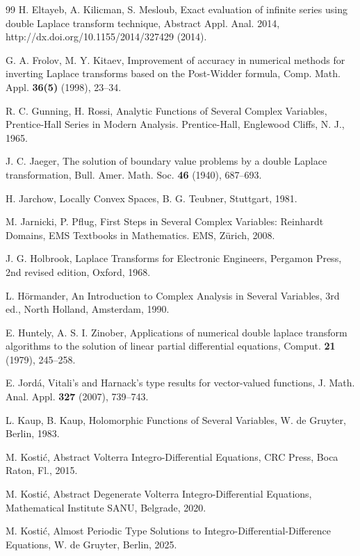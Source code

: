 \documentclass{amsart}
\theoremstyle{definition}
\theoremstyle{remark}
\numberwithin{equation}{section}
\begin{document}
\begin{thebibliography}{99}
H. Eltayeb, A. Kilicman, S. Mesloub,
Exact evaluation of infinite series using double Laplace
transform technique,
Abstract Appl. Anal. 2014, http://dx.doi.org/10.1155/2014/327429 (2014). 

G. A. Frolov, M. Y. Kitaev,
Improvement of accuracy in numerical
methods for inverting Laplace transforms
based on the Post-Widder formula,
Comp. Math. Appl. {\bf 36(5)} (1998), 23--34.

R. C. Gunning, H. Rossi,
Analytic Functions of Several Complex Variables,
Prentice-Hall Series in Modern Analysis. Prentice-Hall, Englewood Cliffs, N.
J., 1965.

J. C. Jaeger, 
The solution of boundary value problems by a double Laplace
transformation,
Bull. Amer. Math. Soc. {\bf 46} (1940), 687--693.

H. Jarchow,
Locally Convex Spaces,
B. G. Teubner, Stuttgart, 1981.

M. Jarnicki, P. Pflug,
First Steps in Several Complex Variables: Reinhardt Domains, EMS Textbooks in Mathematics. EMS, Z\"urich, 2008.

J. G. Holbrook,
Laplace Transforms for Electronic Engineers,
Pergamon Press, 2nd revised edition, Oxford, 1968.

L. H\"ormander,
An Introduction to Complex Analysis in Several Variables, 3rd ed.,
North Holland, Amsterdam, 1990.

E. Huntely, A. S. I. Zinober,
Applications of numerical double laplace transform algorithms to the solution of linear partial differential equations,
Comput. {\bf 21} (1979), 245--258.

E. Jord\'a, 
Vitali's and Harnack's type results for vector-valued functions, 
J. Math. Anal. Appl. {\bf 327} (2007), 739--743.

L. Kaup, B. Kaup,
Holomorphic Functions of Several Variables,
W. de Gruyter, Berlin, 1983.

M. Kosti\'c, 
Abstract Volterra Integro-Differential Equations,
CRC Press, Boca Raton, Fl., 2015.

M. Kosti\'c, 
Abstract Degenerate Volterra Integro-Differential Equations,
Mathematical Institute SANU, Belgrade, 2020.

M. Kosti\'c, 
Almost Periodic Type Solutions to Integro-Differential-Difference Equations,
W. de Gruyter, Berlin, 2025.


\end{thebibliography}
\end{document}
